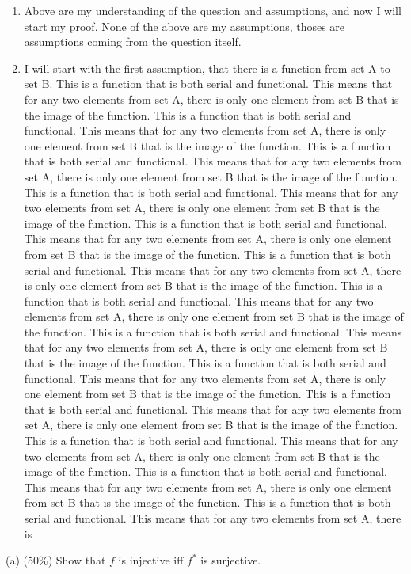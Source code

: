 \documentclass[10pt]{article}
\begin{document}
\begin{enumerate}
\begin{enumerate}
    \item Above are my understanding of the question and assumptions, and now I will start my proof. None of the above are my assumptions, thoses are assumptions coming from the question itself.
    \item I will start with the first assumption, that there is a function from set A to set B. This is a function that is both serial and functional. This means that for any two elements from set A, there is only one element from set B that is the image of the function. This is a function that is both serial and functional. This means that for any two elements from set A, there is only one element from set B that is the image of the function. This is a function that is both serial and functional. This means that for any two elements from set A, there is only one element from set B that is the image of the function. This is a function that is both serial and functional. This means that for any two elements from set A, there is only one element from set B that is the image of the function. This is a function that is both serial and functional. This means that for any two elements from set A, there is only one element from set B that is the image of the function. This is a function that is both serial and functional. This means that for any two elements from set A, there is only one element from set B that is the image of the function. This is a function that is both serial and functional. This means that for any two elements from set A, there is only one element from set B that is the image of the function. This is a function that is both serial and functional. This means that for any two elements from set A, there is only one element from set B that is the image of the function. This is a function that is both serial and functional. This means that for any two elements from set A, there is only one element from set B that is the image of the function. This is a function that is both serial and functional. This means that for any two elements from set A, there is only one element from set B that is the image of the function. This is a function that is both serial and functional. This means that for any two elements from set A, there is only one element from set B that is the image of the function. This is a function that is both serial and functional. This means that for any two elements from set A, there is only one element from set B that is the image of the function. This is a function that is both serial and functional. This means that for any two elements from set A, there is
  \end{enumerate}
\end{enumerate}
(a) (50\%) Show that $f$ is injective iff $f^{*}$ is surjective.
\end{document}
